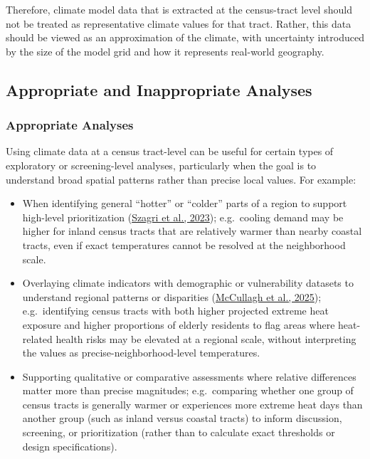 \documentclass[
  letterpaper,
  DIV=11,
  numbers=noendperiod]{scrartcl}
\providecommand{\tightlist}{%
  \setlength{\itemsep}{0pt}\setlength{\parskip}{0pt}}
\begin{document}
Therefore, climate model data that is extracted at the census-tract
level should not be treated as representative climate values for that
tract. Rather, this data should be viewed as an approximation of the
climate, with uncertainty introduced by the size of the model grid and
how it represents real-world geography.

\subsection{Appropriate and Inappropriate
Analyses}\label{appropriate-and-inappropriate-analyses}

\subsubsection{Appropriate Analyses}\label{appropriate-analyses}

Using climate data at a census tract-level can be useful for certain
types of exploratory or screening-level analyses, particularly when the
goal is to understand broad spatial patterns rather than precise local
values. For example:

\begin{itemize}
\tightlist
\item
  When identifying general ``hotter'' or ``colder'' parts of a region to
  support high-level prioritization
  (\href{https://doi.org/10.1016/j.uclim.2023.101711}{Szagri et al.,
  2023}); e.g.~cooling demand may be higher for inland census tracts
  that are relatively warmer than nearby coastal tracts, even if exact
  temperatures cannot be resolved at the neighborhood scale.
\item
  Overlaying climate indicators with demographic or vulnerability
  datasets to understand regional patterns or disparities
  (\href{https://doi.org/10.1016/j.mex.2025.103290}{McCullagh et al.,
  2025}); e.g.~identifying census tracts with both higher projected
  extreme heat exposure and higher proportions of elderly residents to
  flag areas where heat-related health risks may be elevated at a
  regional scale, without interpreting the values as
  precise-neighborhood-level temperatures.
\item
  Supporting qualitative or comparative assessments where relative
  differences matter more than precise magnitudes; e.g.~comparing
  whether one group of census tracts is generally warmer or experiences
  more extreme heat days than another group (such as inland versus
  coastal tracts) to inform discussion, screening, or prioritization
  (rather than to calculate exact thresholds or design specifications).
\end{itemize}
\end{document}
